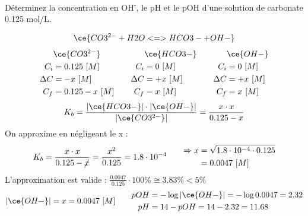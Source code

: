 \documentclass[
  11pt,
  a4paper,
  openany]{book}
\begin{document}
\begin{Exercise}
Déterminez la concentration en OH\textsuperscript{-}, le pH et le pOH d'une solution de carbonate 0.125 mol/L.

\end{Exercise}

\begin{Answer}
\[
\ce{CO3^{2-} + H2O <=> HCO3- + OH-}
\]
\[
\begin{split}
&\ce{CO3^{2-}}\\
C_i &= 0.125\ [M] \\
\Delta C &= - x\ [M] \\
C_f &= 0.125 - x\ [M] \\
\end{split}
\qquad
\begin{split}
&\ce{HCO3-}\\
C_i &= 0\ [M] \\
\Delta C &= + x\ [M] \\
C_f &= x\ [M] \\
\end{split}
\qquad
\begin{split}
&\ce{OH-}\\
C_i &= 0\ [M] \\
\Delta C &= + x\ [M] \\
C_f &= x\ [M] \\
\end{split}
\]
\[
K_b = \frac{|\ce{HCO3-}| \cdot |\ce{OH-}|}{|\ce{CO3^{2-}}|} = \frac{x \cdot x}{0.125 - x}
\]
On approxime en négligeant le x :
\[
\begin{split}
K_b = \frac{x \cdot x}{0.125 - \cancel{x}} = \frac{x^2}{0.125} = 1.8 \cdot 10^{-4}
\end{split}
\qquad
\begin{split}
\Rightarrow x &= \sqrt{1.8 \cdot 10^{-4} \cdot 0.125} \\
  &= 0.0047\ [M]
\end{split}
\]
L'approximation est valide : \(\frac{0.0047}{0.125} \cdot 100\% \cong 3.83\% < 5\%\)
\[
\begin{split}
|\ce{OH-}| = x = 0.0047\ [M] 
\end{split}
\qquad
\begin{split}
pOH &= - \log |\ce{OH-}| = - \log 0.0047 = 2.32 \\
pH &= 14 - pOH = 14 - 2.32 = 11.68
\end{split}
\]

\end{Answer}
\end{document}

